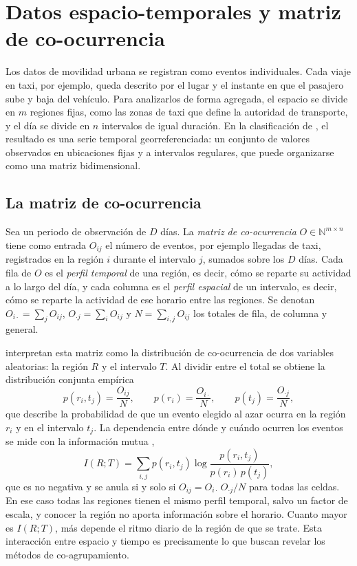 \section{Datos espacio-temporales y matriz de co-ocurrencia}\label{sec:matriz}

Los datos de movilidad urbana se registran como eventos individuales. Cada viaje
en taxi, por ejemplo, queda descrito por el lugar y el instante en que el pasajero
sube y baja del vehículo. Para analizarlos de forma agregada, el espacio se divide
en $m$ regiones fijas, como las zonas de taxi que define la autoridad de
transporte, y el día se divide en $n$ intervalos de igual duración. En la
clasificación de \cite{Wu2020}, el resultado es una serie temporal
georreferenciada: un conjunto de valores observados en ubicaciones fijas y a
intervalos regulares, que puede organizarse como una matriz bidimensional.

\subsection{La matriz de co-ocurrencia}

Sea un periodo de observación de $D$ días. La \emph{matriz de co-ocurrencia}
$O \in \mathbb{N}^{m \times n}$ tiene como entrada $O_{ij}$ el número de eventos,
por ejemplo llegadas de taxi, registrados en la región $i$ durante el intervalo
$j$, sumados sobre los $D$ días. Cada fila de $O$ es el \emph{perfil temporal} de
una región, es decir, cómo se reparte su actividad a lo largo del día, y cada
columna es el \emph{perfil espacial} de un intervalo, es decir, cómo se reparte la
actividad de ese horario entre las regiones. Se denotan
$O_{i\cdot} = \sum_j O_{ij}$, $O_{\cdot j} = \sum_i O_{ij}$ y $N = \sum_{i,j} O_{ij}$
los totales de fila, de columna y general.

\cite{Liu2021} interpretan esta matriz como la distribución de co-ocurrencia de dos
variables aleatorias: la región $R$ y el intervalo $T$. Al dividir entre el total
se obtiene la distribución conjunta empírica
\begin{equation}\label{eq:conjunta}
  p(r_i, t_j) = \frac{O_{ij}}{N}, \qquad
  p(r_i) = \frac{O_{i\cdot}}{N}, \qquad
  p(t_j) = \frac{O_{\cdot j}}{N},
\end{equation}
que describe la probabilidad de que un evento elegido al azar ocurra en la región
$r_i$ y en el intervalo $t_j$. La dependencia entre dónde y cuándo ocurren los
eventos se mide con la información mutua \cite{Cover2006},
\begin{equation}\label{eq:im}
  I(R;T) = \sum_{i,j} p(r_i,t_j) \log \frac{p(r_i,t_j)}{p(r_i)\,p(t_j)} ,
\end{equation}
que es no negativa y se anula si y solo si
$O_{ij} = O_{i\cdot}\,O_{\cdot j}/N$ para todas las celdas. En ese caso todas las
regiones tienen el mismo perfil temporal, salvo un factor de escala, y conocer la
región no aporta información sobre el horario. Cuanto mayor es $I(R;T)$, más
depende el ritmo diario de la región de que se trate. Esta interacción entre
espacio y tiempo es precisamente lo que buscan revelar los métodos de
co-agrupamiento.

